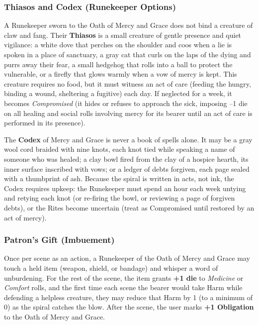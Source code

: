 \subsubsection*{Thiasos and Codex (Runekeeper Options)}

A Runekeeper sworn to the Oath of Mercy and Grace does not bind a creature of claw and fang. Their \textbf{Thiasos} is a small creature of gentle presence and quiet vigilance: a white dove that perches on the shoulder and coos when a lie is spoken in a place of sanctuary, a gray cat that curls on the laps of the dying and purrs away their fear, a small hedgehog that rolls into a ball to protect the vulnerable, or a firefly that glows warmly when a vow of mercy is kept. This creature requires no food, but it must witness an act of care (feeding the hungry, binding a wound, sheltering a fugitive) each day. If neglected for a week, it becomes \textit{Compromised} (it hides or refuses to approach the sick, imposing --1 die on all healing and social rolls involving mercy for its bearer until an act of care is performed in its presence).

The \textbf{Codex} of Mercy and Grace is never a book of spells alone. It may be a gray wool cord braided with nine knots, each knot tied while speaking a name of someone who was healed; a clay bowl fired from the clay of a hospice hearth, its inner surface inscribed with vows; or a ledger of debts forgiven, each page sealed with a thumbprint of ash. Because the spiral is written in acts, not ink, the Codex requires upkeep: the Runekeeper must spend an hour each week untying and retying each knot (or re-firing the bowl, or reviewing a page of forgiven debts), or the Rites become uncertain (treat as Compromised until restored by an act of mercy).

\subsubsection*{Patron's Gift (Imbuement)}

Once per scene as an action, a Runekeeper of the Oath of Mercy and Grace may touch a held item (weapon, shield, or bandage) and whisper a word of unburdening. For the rest of the scene, the item grants \textbf{+1 die} to \textit{Medicine} or \textit{Comfort} rolls, and the first time each scene the bearer would take Harm while defending a helpless creature, they may reduce that Harm by 1 (to a minimum of 0) as the spiral catches the blow. After the scene, the user marks \textbf{+1 Obligation} to the Oath of Mercy and Grace.

